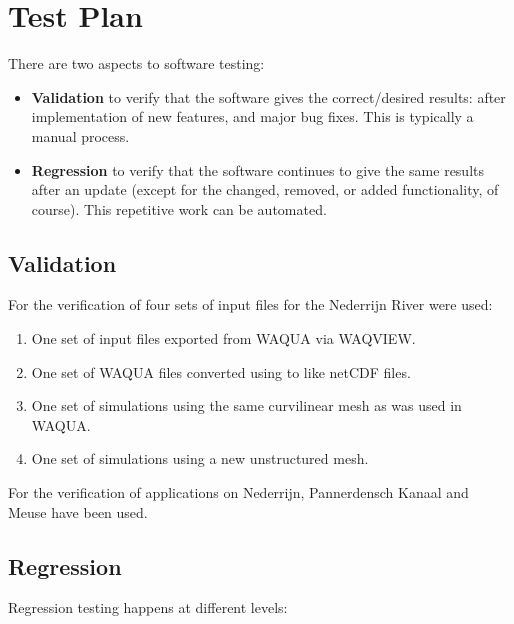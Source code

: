 \chapter{Test Plan} \label{Chp:TestPlan}

There are two aspects to software testing:

\begin{itemize}
\item \textbf{Validation} to verify that the software gives the correct/desired results: after implementation of new features, and major bug fixes.
This is typically a manual process.
\item \textbf{Regression} to verify that the software continues to give the same results after an update (except for the changed, removed, or added functionality, of course).
This repetitive work can be automated.
\end{itemize}


\section{Validation}

For the verification of  four sets of input files for the Nederrijn River were used:

\begin{enumerate}
\item One set of input files exported from WAQUA via WAQVIEW.
\item One set of WAQUA files converted using  to \dflowfm like netCDF files.
\item One set of \dflowfm simulations using the same curvilinear mesh as was used in WAQUA.
\item One set of \dflowfm simulations using a new unstructured mesh.
\end{enumerate}

For the verification of  applications on Nederrijn, Pannerdensch Kanaal and Meuse have been used.


\section{Regression}

Regression testing happens at different levels:

